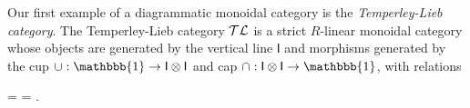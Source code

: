 \begin{example}
    Our first example of a diagrammatic monoidal category is the \textit{Temperley-Lieb category}. The Temperley-Lieb category $\mathcal{TL}$ is a strict $R$-linear monoidal category whose objects are generated by the vertical line $\mathsf{I}$ and morphisms generated by the cup $\cup: \mathbbb{1} \to \mathsf{I} \tensor \mathsf{I}$ and cap $\cap: \mathsf{I} \tensor \mathsf{I} \to \mathbbb{1}$, with relations
    \begin{center}
        = 
        = .
    \end{center}





\end{example}


















